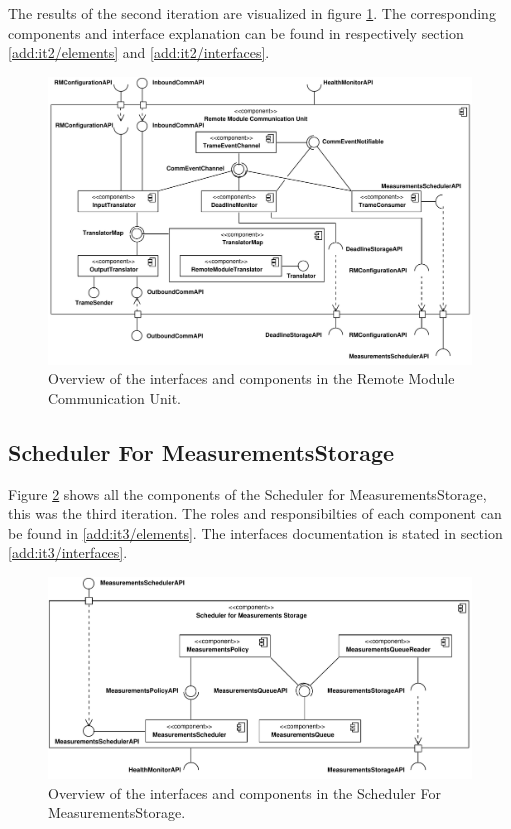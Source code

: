 \npar The results of the second iteration are visualized in figure
\ref{fig:final-architecture/it2}. The corresponding components and interface
explanation can be found in respectively section \ref{add:it2/elements} and
\ref{add:it2/interfaces}.

\begin{figure}
	\begin{centering}
		\includegraphics[width=\textwidth]{figs/add-it2-interfaces.pdf}
		\caption{Overview of the interfaces and components in the Remote
		Module Communication Unit.}
		\label{fig:final-architecture/it2}
	\end{centering}
\end{figure}

\subsection{Scheduler For MeasurementsStorage}

\npar Figure \ref{fig:final-architecture/it3} shows all the components of the
Scheduler for MeasurementsStorage, this was the third iteration. The roles and
responsibilties of each component can be found in \ref{add:it3/elements}. The
interfaces documentation is stated in section \ref{add:it3/interfaces}.

\begin{figure}
	\begin{centering}
		\includegraphics[width=\textwidth]{figs/add-it3-interfaces.pdf}
		\caption{Overview of the interfaces and components in the Scheduler For
		MeasurementsStorage.}
		\label{fig:final-architecture/it3}
	\end{centering}
\end{figure}

